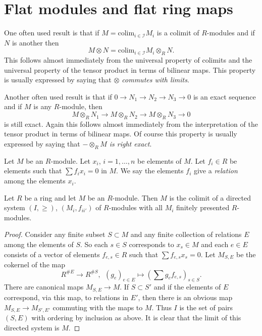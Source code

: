 \section{Flat modules and flat ring maps}
\label{section-flat}

\noindent
One often used result is that if $M = \text{colim}_{i\in \mathcal{I}} M_i$
is a colimit of $R$-modules and if $N$ is another then
$$
M \otimes N
=
\text{colim}_{i\in \mathcal{I}} M_i \otimes_R N.
$$
This follows almost immediately from the universal 
property of colimits and the universal property of
the tensor product in terms of bilinear maps.
This property is usually expressed by saying
that {\it $\otimes$ commutes with limits}.

\medskip\noindent
Another often used result is that if $0\to N_1 \to N_2 \to N_3\to 0$
is an exact sequence and if $M$ is any $R$-module, then
$$
M\otimes_R N_1
\to
M\otimes_R N_2
\to
M\otimes_R N_3
\to
0
$$
is still exact. Again this follows almost immediately from
the interpretation of the tensor product in terms of
bilinear maps. Of course this property is usually expressed
by saying that {\it $-\otimes_R M$ is right exact}.

\medskip\noindent
Let $M$ be an $R$-module. Let $x_i$, $i=1,\ldots,n$ be elements
of $M$. Let $f_i \in R$ be elements such that $\sum f_i x_i = 0$
in $M$. We say the elements $f_i$ give a {\it relation}
among the elements $x_i$.

\begin{lemma}
\label{lemma-module-colimit-fp}
Let $R$ be a ring and let $M$ be an $R$-module.
Then $M$ is the colimit of a directed system
$(I, \geq)$, $(M_i, f_{ii'})$ of $R$-modules
with all $M_i$ finitely presented $R$-modules.
\end{lemma}

\begin{proof}
Consider any finite subset $S \subset M$ and any finite
collection of relations $E$ among the elements
of $S$. So each $s \in S$ corresponds to $x_s \in M$ and
each $e \in E$ consists of a vector
of elements $f_{e,s} \in R$ such that $\sum f_{e,s} x_s = 0$.
Let $M_{S,E}$ be the cokernel of the map
$$
R^{\#E}
\longrightarrow
R^{\#S},\ \ 
(g_e)_{e\in E}
\longmapsto
(\sum g_e f_{e,s})_{s\in S}.
$$
There are canonical maps $M_{S,E} \to M$.
If $S \subset S'$ and if the elements of
$E$ correspond, via this map, to relations 
in $E'$, then there is an obvious map
$M_{S,E} \to M_{S', E'}$ commuting with the
maps to $M$. Thus $I$ is the set of pairs 
$(S,E)$ with ordering by inclusion as above.
It is clear that the limit of this directed system is $M$.
\end{proof}

